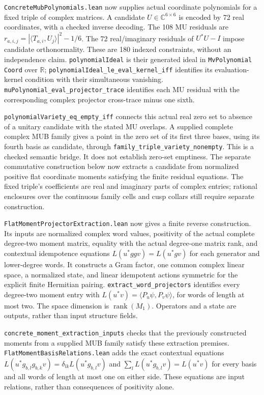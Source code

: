 \documentclass[
]{article}
\begin{document}
\nolinkurl{ConcreteMubPolynomials.lean} now supplies actual coordinate
polynomials for a fixed triple of complex matrices. A candidate
\(U\in\mathbb C^{6\times6}\) is encoded by 72 real coordinates, with a
checked inverse decoding. The 108 MU residuals are
\(r_{a,i,j}=|\langle T_{a,i},U_j\rangle|^2-1/6\). The 72 real/imaginary
residuals of \(U^*U-I\) impose candidate orthonormality. These are 180
indexed constraints, without an independence claim.
\nolinkurl{polynomialIdeal} is their generated ideal in
\nolinkurl{MvPolynomial Coord} over \(\mathbb R\);
\nolinkurl{polynomialIdeal_le_eval_kernel_iff} identifies its
evaluation-kernel condition with their simultaneous vanishing.
\nolinkurl{muPolynomial_eval_projector_trace} identifies each MU
residual with the corresponding complex projector cross-trace minus one
sixth.

\nolinkurl{polynomialVariety_eq_empty_iff} connects this actual real
zero set to absence of a unitary candidate with the stated MU overlaps.
A supplied complete complex MUB family gives a point in the zero set of
its first three bases, using its fourth basis as candidate, through
\nolinkurl{family_triple_variety_nonempty}. This is a checked semantic
bridge. It does not establish zero-set emptiness. The separate
commutative construction below now extracts a candidate from normalized
positive flat coordinate moments satisfying the finite residual
equations. The fixed triple's coefficients are real and imaginary parts
of complex entries; rational enclosures over the continuous family cells
and cusp collars still require separate construction.

\nolinkurl{FlatMomentProjectorExtraction.lean} now gives a finite
reverse construction. Its inputs are normalized complex word values,
positivity of the actual complete degree-two moment matrix, equality
with the actual degree-one matrix rank, and contextual idempotence
equations \(L(u^*ggv)=L(u^*gv)\) for each generator and lower-degree
words. It constructs a Gram factor, one common complex linear space, a
normalized state, and linear idempotent actions symmetric for the
explicit finite Hermitian pairing. \nolinkurl{extract_word_projectors}
identifies every degree-two moment entry with
\(L(u^*v)=\langle P_u\psi,P_v\psi\rangle\), for words of length at most
two. The space dimension is \(\operatorname{rank}(M_1)\). Operators and
a state are outputs, rather than input structure fields.

\nolinkurl{concrete_moment_extraction_inputs} checks that the previously
constructed moments from a supplied MUB family satisfy these extraction
premises. \nolinkurl{FlatMomentBasisRelations.lean} adds the exact
contextual equations \(L(u^*g_{b,l}g_{b,k}v)=\delta_{lk}L(u^*g_{b,l}v)\)
and \(\sum_l L(u^*g_{b,l}v)=L(u^*v)\) for every basis and all words of
length at most one on either side. These equations are input relations,
rather than consequences of positivity alone.
\end{document}

